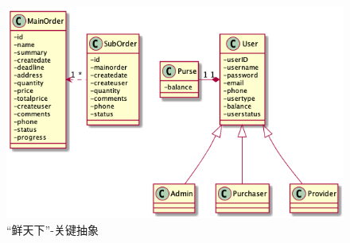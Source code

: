 \begin{figure}[htp]
    \centering
    \includegraphics[width=15cm]{report/figure/key_abstract.png}
    \caption{“鲜天下”-关键抽象}
    \label{fig:key-abstraction}
\end{figure}
